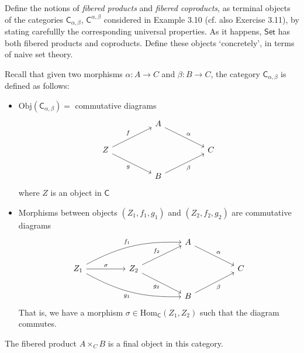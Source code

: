 \documentclass[../../master.tex]{subfiles}
\begin{document}
    \begin{problem}
      Define the notions of \textit{fibered products} and \textit{fibered coproducts},
      as terminal objects of the categories \(\mathsf{C}_{\alpha, \beta}\), \(\mathsf{C}^{\alpha, \beta}\) considered in Example 3.10
      (cf. also Exercise 3.11),
      by stating carefullly the corresponding universal properties.
      As it happens, \(\mathsf{Set}\) has both fibered products and coproducts.
      Define these objects `concretely', in terms of naive set theory.
    \end{problem}

    \begin{solution}
      Recall that given two morphisms \(\alpha: A \to C\) and \(\beta: B \to C\),
      the category \(\mathsf{C}_{\alpha, \beta}\) is defined as follows:
      \begin{itemize}
        \item \(\text{Obj}(\mathsf{C}_{\alpha, \beta}) = \) commutative diagrams
        \[
        \begin{tikzcd}
	        && {A} \\
	        {Z} &&&& {C} \\
	        && {B}
	        \arrow["{f}", from=2-1, to=1-3]
	        \arrow["{g}"', from=2-1, to=3-3]
	        \arrow["{\alpha}", from=1-3, to=2-5]
	        \arrow["{\beta}"', from=3-3, to=2-5]
        \end{tikzcd}
        \]
        where \(Z\) is an object in \(\mathsf{C}\)
        \item Morphisms between objects \((Z_{1}, f_{1}, g_{1})\) and \((Z_{2}, f_{2}, g_{2})\) are commutative diagrams
        \[
        \begin{tikzcd}
	        &&&& {A} \\
	        {Z_{1}} && {Z_{2}} &&&& {C} \\
	        &&&& {B}
	        \arrow["{\alpha}", from=1-5, to=2-7]
	        \arrow["{\beta}"', from=3-5, to=2-7]
	        \arrow["{f_{1}}", from=2-1, to=1-5, bend left=15]
	        \arrow["{g_{1}}"', from=2-1, to=3-5, bend right=15]
	        \arrow["{f_{2}}", from=2-3, to=1-5]
	        \arrow["{g_{2}}"', from=2-3, to=3-5]
	        \arrow["{\sigma}", from=2-1, to=2-3]
        \end{tikzcd}
        \]
        That is, we have a morphism \(\sigma \in \text{Hom}_{\mathsf{C}}(Z_{1}, Z_{2})\) such that the diagram commutes.
      \end{itemize}
      The fibered product \(A \times_{C} B\) is a final object in this category.

\end{solution}
\end{document}
